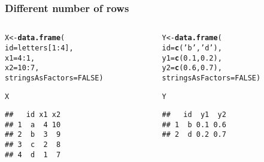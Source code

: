 \documentclass[12pt]{beamer}\usepackage[]{graphicx}\usepackage[]{color}
\makeatletter
\newcommand{\hlnum}[1]{\textcolor[rgb]{0.686,0.059,0.569}{#1}}%
\newcommand{\hlstr}[1]{\textcolor[rgb]{0.192,0.494,0.8}{#1}}%
\newcommand{\hlopt}[1]{\textcolor[rgb]{0,0,0}{#1}}%
\newcommand{\hlstd}[1]{\textcolor[rgb]{0.345,0.345,0.345}{#1}}%
\newcommand{\hlkwb}[1]{\textcolor[rgb]{0.69,0.353,0.396}{#1}}%
\newcommand{\hlkwc}[1]{\textcolor[rgb]{0.333,0.667,0.333}{#1}}%
\newcommand{\hlkwd}[1]{\textcolor[rgb]{0.737,0.353,0.396}{\textbf{#1}}}%
\newenvironment{kframe}{%
 \def\at@end@of@kframe{}%
 \ifinner\ifhmode%
  \def\at@end@of@kframe{\end{minipage}}%
  \begin{minipage}{\columnwidth}%
 \fi\fi%
 \def\FrameCommand##1{\hskip\@totalleftmargin \hskip-\fboxsep
 \colorbox{shadecolor}{##1}\hskip-\fboxsep
     \hskip-\linewidth \hskip-\@totalleftmargin \hskip\columnwidth}%
 \MakeFramed {\advance\hsize-\width
   \@totalleftmargin\z@ \linewidth\hsize
   \@setminipage}}%
 {\par\unskip\endMakeFramed%
 \at@end@of@kframe}
\newenvironment{knitrout}{}{} %
\makeatother
\begin{document}

\begin{frame}[fragile]
\frametitle{Different number of rows}

\begin{columns}[t]
\begin{column}{0.4\textwidth}
\begin{knitrout}\footnotesize
{}\color{fgcolor}\begin{kframe}
\begin{alltt}
\hlstd{X} \hlkwb{<-} \hlkwd{data.frame}\hlstd{(}
  \hlkwc{id} \hlstd{= letters[}\hlnum{1}\hlopt{:}\hlnum{4}\hlstd{],}
  \hlkwc{x1} \hlstd{=} \hlnum{4}\hlopt{:}\hlnum{1}\hlstd{,}
  \hlkwc{x2} \hlstd{=} \hlnum{10}\hlopt{:}\hlnum{7}\hlstd{,}
  \hlkwc{stringsAsFactors} \hlstd{=} \hlnum{FALSE}\hlstd{)}

\hlstd{X}
\end{alltt}
\begin{verbatim}
##   id x1 x2
## 1  a  4 10
## 2  b  3  9
## 3  c  2  8
## 4  d  1  7
\end{verbatim}
\end{kframe}
\end{knitrout}
\end{column}

\begin{column}{0.5\textwidth}
\begin{knitrout}\footnotesize
{}\color{fgcolor}\begin{kframe}
\begin{alltt}
\hlstd{Y} \hlkwb{<-} \hlkwd{data.frame}\hlstd{(}
  \hlkwc{id} \hlstd{=} \hlkwd{c}\hlstd{(}\hlstr{'b'}\hlstd{,} \hlstr{'d'}\hlstd{),}
  \hlkwc{y1} \hlstd{=} \hlkwd{c}\hlstd{(}\hlnum{0.1}\hlstd{,} \hlnum{0.2}\hlstd{),}
  \hlkwc{y2} \hlstd{=} \hlkwd{c}\hlstd{(}\hlnum{0.6}\hlstd{,} \hlnum{0.7}\hlstd{),}
  \hlkwc{stringsAsFactors} \hlstd{=} \hlnum{FALSE}\hlstd{)}

\hlstd{Y}
\end{alltt}
\begin{verbatim}
##   id  y1  y2
## 1  b 0.1 0.6
## 2  d 0.2 0.7
\end{verbatim}
\end{kframe}
\end{knitrout}
\end{column}
\end{columns}

\end{frame}
\end{document}
